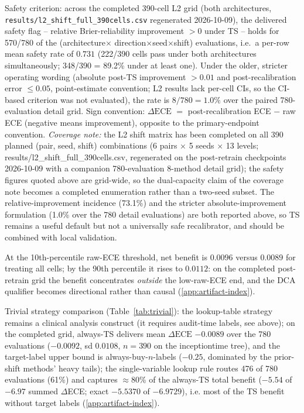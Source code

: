 \documentclass[final,5p,times,nonatbib]{elsarticle}
\begin{document}
Safety criterion: across the completed 390-cell L2 grid (both
architectures, \texttt{results/l2\_shift\_full\_390cells.csv} regenerated
2026-10-09), the delivered safety flag -- relative Brier-reliability
improvement $>0$ under TS -- holds for 570/780 of the (architecture$\times$
direction$\times$seed$\times$shift) evaluations, i.e.\ a per-row mean safety
rate of $0.731$ (222/390 cells pass under both architectures
simultaneously; 348/390 = 89.2\% under at least one). Under the older,
stricter operating wording (absolute post-TS improvement $>0.01$ and
post-recalibration error $\leq 0.05$, point-estimate convention; L2
results lack per-cell CIs, so the CI-based criterion was not evaluated),
the rate is $8/780 = 1.0\%$ over the paired 780-evaluation detail grid.
Sign convention:
$\Delta\text{ECE}$ $=$ post-recalibration ECE $-$ raw ECE (negative means
improvement), opposite to the primary-endpoint convention.
\emph{Coverage note:} the L2 shift matrix has been completed on all 390
planned (pair, seed, shift) combinations (6 pairs $\times$ 5 seeds
$\times$ 13 levels; results/l2\_shift\_full\_390cells.csv, regenerated on
the post-retrain checkpoints 2026-10-09 with a companion 780-evaluation
8-method detail grid); the safety figures quoted above are grid-wide, so
the dual-capacity claim of the coverage note becomes a completed
enumeration rather than a two-seed subset. The relative-improvement
incidence (73.1\%) and the stricter absolute-improvement formulation
(1.0\% over the 780 detail evaluations) are both reported above, so TS
remains a useful default but not a universally safe recalibrator, and
should be combined with local validation.

At the 10th-percentile raw-ECE
threshold, net benefit is $0.0096$ versus $0.0089$ for treating all cells;
by the 90th percentile it rises to $0.0112$: on the completed post-retrain
grid the benefit concentrates \emph{outside} the low-raw-ECE end, and the
DCA qualifier becomes directional rather than causal
(\ref{app:artifact-index}).

Trivial strategy comparison (Table~\ref{tab:trivial}): the
lookup-table strategy remains a clinical analysis construct (it requires
audit-time labels, see above); on the completed grid, always-TS delivers
mean $\Delta\text{ECE}$ $-0.0089$ over the 780 evaluations ($-0.0092$,
sd $0.0108$, $n=390$ on the inceptiontime tree), and the
target-label upper bound is always-buy-$n$-labels ($-0.25$, dominated by
the prior-shift methods' heavy tails); the single-variable lookup rule
routes 476 of 780 evaluations (61\%) and captures $\approx$80\% of the
always-TS total benefit ($-5.54$ of $-6.97$ summed $\Delta$ECE; exact
$-5.5370$ of $-6.9729$), i.e.
most of the TS benefit without target labels
(\ref{app:artifact-index}).
\end{document}
